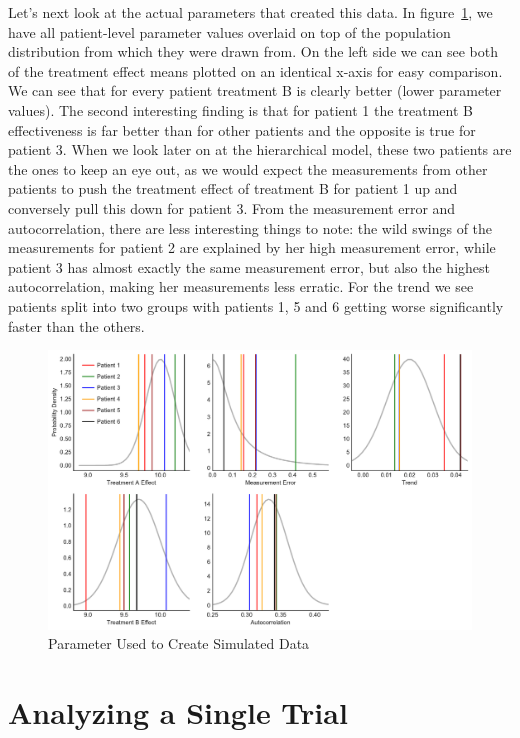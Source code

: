 \documentclass[12pt,a4paper,leqno]{report}
\theoremstyle{plain}
\theoremstyle{definition}
\theoremstyle{remark}
\begin{document}
Let's next look at the actual parameters that created this data.
In figure\ \ref{parameterdistribution}, we have all patient-level parameter values
overlaid on top of the population
distribution from which they were drawn from. On the left side we can see both of the
treatment effect means plotted on an identical x-axis for easy comparison.
We can see that for every patient treatment B is clearly
better (lower parameter values). The second interesting finding is that for patient
1 the treatment B effectiveness is far better than for other patients and the opposite
is true for patient 3. When we look later on at
the hierarchical model, these two patients are the ones to keep an eye out, as we would
expect the measurements from other patients to push the treatment effect of
treatment B for patient 1 up and conversely pull this down for patient
3. From the measurement error and autocorrelation, there are less interesting things to
note: the wild swings of the measurements for patient 2
are explained by her high measurement error, while patient 3 has almost exactly the same
measurement error, but also the highest autocorrelation, making her measurements less
erratic. For the trend we see patients split into two groups with patients 1, 5 and 6 getting
worse significantly faster than the others.

\begin{figure}[H]
    \caption{Parameter Used to Create Simulated Data}\label{parameterdistribution}
    \bigskip
    \includegraphics[width=\textwidth,height=\textheight,keepaspectratio]{population_parameter_distributions.pdf}
\end{figure}

\section{Analyzing a Single Trial}\label{1trial}
\end{document}
